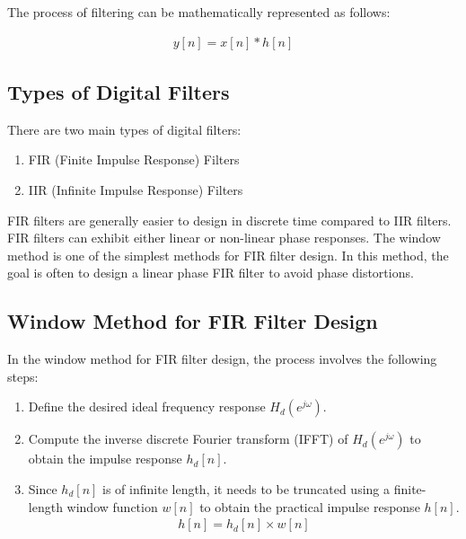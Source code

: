 \documentclass{article}
\begin{document}
The process of filtering can be mathematically represented as follows:

\begin{align}
y[n] = x[n] \ast h[n]
\end{align}


\subsection{Types of Digital Filters}

There are two main types of digital filters:
\begin{enumerate}
  \item FIR (Finite Impulse Response) Filters
  \item IIR (Infinite Impulse Response) Filters
\end{enumerate}

FIR filters are generally easier to design in discrete time compared to IIR filters. FIR filters can exhibit either linear or non-linear phase responses. The window method is one of the simplest methods for FIR filter design. In this method, the goal is often to design a linear phase FIR filter to avoid phase distortions.

\subsection{Window Method for FIR Filter Design}

In the window method for FIR filter design, the process involves the following steps:
\begin{enumerate}
  \item Define the desired ideal frequency response \(H_d(e^{j\omega})\).
  \item Compute the inverse discrete Fourier transform (IFFT) of \(H_d(e^{j\omega})\) to obtain the impulse response \(h_d[n]\).
  \item Since \(h_d[n]\) is of infinite length, it needs to be truncated using a finite-length window function \(w[n]\) to obtain the practical impulse response \(h[n]\).
\begin{align}
  h[n] = h_d[n] \times w[n]
\end{align}

\end{enumerate}
\end{document}
